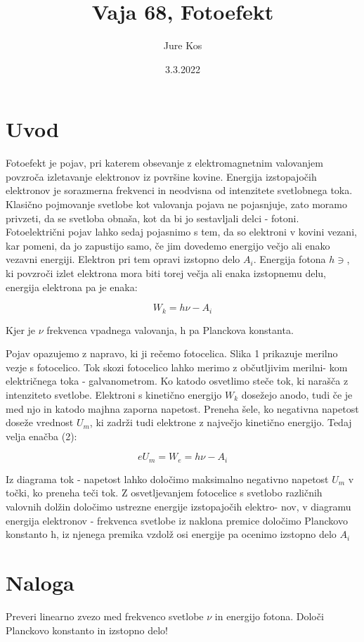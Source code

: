 \documentclass[a4paper]{report}
\author{Jure Kos}
\title{Vaja 68, Fotoefekt}
\date{3.3.2022}
\begin{document}
\maketitle

\chapter*{Uvod}
Fotoefekt je pojav, pri katerem obsevanje z elektromagnetnim valovanjem
povzroča izletavanje elektronov iz površine kovine. Energija izstopajočih
elektronov je sorazmerna frekvenci in neodvisna od intenzitete svetlobnega
toka. Klasično pojmovanje svetlobe kot valovanja pojava ne pojasnjuje,
zato moramo privzeti, da se svetloba obnaša, kot da bi jo sestavljali delci -
fotoni. Fotoelektrični pojav lahko sedaj pojasnimo s tem, da so elektroni v
kovini vezani, kar pomeni, da jo zapustijo samo, če jim dovedemo energijo
večjo ali enako vezavni energiji. Elektron pri tem opravi izstopno delo
$A_i$. Energija fotona $h\ni$, ki povzroči izlet elektrona mora biti torej večja ali enaka
izstopnemu delu, energija elektrona pa je enaka:

\[W_k = h\nu - A_i\]

Kjer je $\nu$ frekvenca vpadnega valovanja, h pa Planckova konstanta.

Pojav opazujemo z napravo, ki ji rečemo fotocelica. Slika 1 prikazuje merilno
vezje s fotocelico. Tok skozi fotocelico lahko merimo z občutljivim merilni-
kom električnega toka - galvanometrom. Ko katodo osvetlimo steče tok, ki narašča z intenziteto svetlobe. Elektroni s kinetično energijo $W_k$ dosežejo
anodo, tudi če je med njo in katodo majhna zaporna napetost. Preneha
šele, ko negativna napetost doseže vrednost $U_m$, ki zadrži tudi elektrone z
največjo kinetično energijo. Tedaj velja enačba (2):

\[eU_m = W_e = h\nu - A_i\]

Iz diagrama tok - napetost lahko določimo maksimalno negativno napetost
$U_m$ v točki, ko preneha teči tok. Z osvetljevanjem fotocelice s svetlobo
različnih valovnih dolžin določimo ustrezne energije izstopajočih elektro-
nov, v diagramu energija elektronov - frekvenca svetlobe iz naklona premice
določimo Planckovo konstanto
h, iz njenega premika vzdolž osi energije pa
ocenimo izstopno delo $A_i$

\chapter*{Naloga}
Preveri linearno zvezo med frekvenco svetlobe
$\nu$
in energijo fotona. Določi
Planckovo konstanto in izstopno delo!
\end{document}
